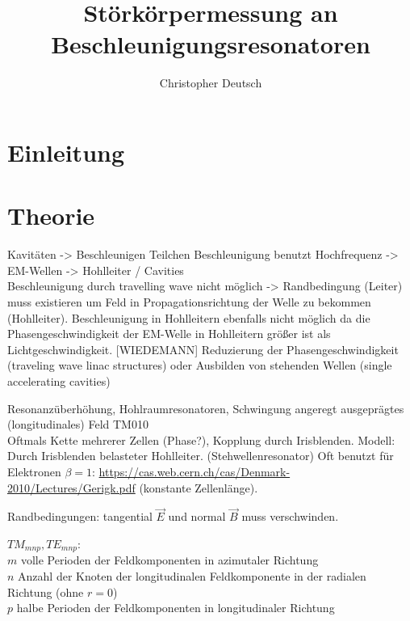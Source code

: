 \documentclass[11pt, a4paper]{scrbook}
\title{Störkörpermessung an Beschleunigungsresonatoren}
\author{Christopher Deutsch}
\newcommand{\ve}{\vec{E}}
\newcommand{\vb}{\vec{B}}
\begin{document}
	\frontmatter
	\maketitle
	\tableofcontents
	
	\mainmatter
	
	\chapter{Einleitung}
	
	
	\chapter{Theorie}
	Kavitäten -> Beschleunigen Teilchen
	Beschleunigung benutzt Hochfrequenz -> EM-Wellen -> Hohlleiter / Cavities\\
	Beschleunigung durch travelling wave nicht möglich -> Randbedingung (Leiter) muss existieren um Feld in Propagationsrichtung der Welle zu bekommen (Hohlleiter).
	Beschleunigung in Hohlleitern ebenfalls nicht möglich da die Phasengeschwindigkeit der EM-Welle in Hohlleitern größer ist als Lichtgeschwindigkeit.
	[WIEDEMANN] Reduzierung der Phasengeschwindigkeit (traveling wave linac structures) oder Ausbilden von stehenden Wellen (single accelerating cavities)
	
	Resonanzüberhöhung, Hohlraumresonatoren, Schwingung angeregt ausgeprägtes (longitudinales) Feld TM010\\
	Oftmals Kette mehrerer Zellen (Phase?), Kopplung durch Irisblenden.
	Modell: Durch Irisblenden belasteter Hohlleiter. (Stehwellenresonator)
	Oft benutzt für Elektronen $\beta = 1$: \url{https://cas.web.cern.ch/cas/Denmark-2010/Lectures/Gerigk.pdf}
	(konstante Zellenlänge).
	
	Randbedingungen: tangential $\ve$ und normal $\vb$ muss verschwinden.
	
	$TM_{mnp}, TE_{mnp}$:\\
	$m$ volle Perioden der Feldkomponenten in azimutaler Richtung\\
	$n$ Anzahl der Knoten der longitudinalen Feldkomponente in der radialen Richtung (ohne $r=0$)\\
	$p$ halbe Perioden der Feldkomponenten in longitudinaler Richtung
	
\end{document}
